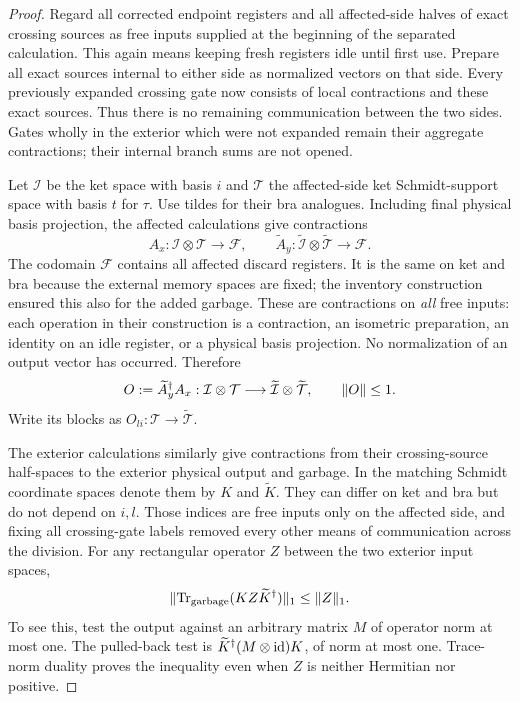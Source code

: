\begin{proof}
Regard all corrected endpoint registers and all affected-side halves of
exact crossing sources as free inputs supplied at the beginning of the
separated calculation.  This again means keeping fresh registers idle
until first use.  Prepare all exact sources internal to either side as
normalized vectors on that side.  Every previously expanded crossing
gate now consists of local contractions and these exact sources.  Thus
there is no remaining communication between the two sides.  Gates
wholly in the exterior which were not expanded remain their aggregate
contractions; their internal branch sums are not opened.

Let $\mathcal I$ be the ket space with basis $i$ and $\mathcal T$ the
affected-side ket Schmidt-support space with basis $t$ for $\tau$.
Use tildes for their bra analogues.  Including final physical basis
projection, the affected calculations give contractions
\[
 A_x:\mathcal I\otimes\mathcal T\longrightarrow\mathcal F,
 \qquad
 \widetilde A_y:\widetilde{\mathcal I}\otimes
              \widetilde{\mathcal T}\longrightarrow\mathcal F.
\]
The codomain $\mathcal F$ contains all affected discard registers.  It
is the same on ket and bra because the external memory spaces are fixed;
the inventory construction ensured this also for the added garbage.
These are contractions on \emph{all} free inputs: each operation in
their construction is a contraction, an isometric preparation, an
identity on an idle register, or a physical basis projection.  No
normalization of an output vector has occurred.  Therefore
\begin{equation}
 O:=\widetilde A_y^\dagger A_x:
       \mathcal I\otimes\mathcal T\longrightarrow
       \widetilde{\mathcal I}\otimes\widetilde{\mathcal T},
 \qquad \lVert O\rVert\le1.
 \label{eq:compression-block-contraction}
\end{equation}
Write its blocks as $O_{li}:\mathcal T\to\widetilde{\mathcal T}$.

The exterior calculations similarly give contractions from their
crossing-source half-spaces to the exterior physical output and
garbage.  In the matching Schmidt coordinate spaces denote them by
$K$ and $\widetilde K$.  They can differ on ket and bra but do not
depend on $i,l$.  Those indices are free inputs only on the affected
side, and fixing all crossing-gate labels removed every other means
of communication across the division.  For any rectangular operator
$Z$ between the two exterior input spaces,
\begin{equation}
 \lVert \operatorname{Tr}_{\mathrm{garbage}}(KZ\widetilde K^\dagger)\rVert_1
          \le\lVert Z\rVert_1.
 \label{eq:compression-exterior-contraction}
\end{equation}
To see this, test the output against an arbitrary matrix $M$ of operator
norm at most one.  The pulled-back test is
$\widetilde K^\dagger(M\otimes\operatorname{id})K$, of norm at most one.
Trace-norm duality proves the inequality even when $Z$ is neither
Hermitian nor positive.


\end{proof}
